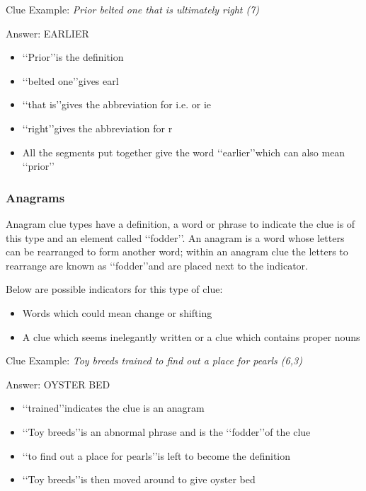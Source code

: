 Clue Example: \emph{Prior belted one that is ultimately right (7)}

Answer: EARLIER 

\begin{itemize}
	\item \lq\lq Prior\rq\rq is the definition 
	\item \lq\lq belted one\rq\rq gives earl 
	\item \lq\lq that is\rq\rq gives the abbreviation for i.e. or ie 
	\item \lq\lq right\rq\rq gives the abbreviation for r 
	\item All the segments put together give the word \lq\lq earlier\rq\rq which can also mean \lq\lq prior\rq\rq
\end{itemize}

\subsubsection{Anagrams}

Anagram clue types have a definition, a word or phrase to indicate the clue is of this type and an element called \lq\lq fodder\rq\rq. An anagram is a word whose letters can be rearranged to form another word; within an anagram clue the letters to rearrange are known as \lq\lq fodder\rq\rq and are placed next to the indicator.  

Below are possible indicators for this type of clue:
\begin{itemize} 
	\item Words which could mean change or shifting 
	\item A clue which seems inelegantly written or a clue which contains proper nouns
\\
\end{itemize}

Clue Example: \emph{Toy breeds trained to find out a place for pearls (6,3)}

Answer: OYSTER BED 

\begin{itemize}
	\item \lq\lq trained\rq\rq indicates the clue is an anagram   
	\item \lq\lq Toy breeds\rq\rq is an abnormal phrase and is the \lq\lq fodder\rq\rq of the clue 
	\item \lq\lq to find out a place for pearls\rq\rq is left to become the definition 
	\item \lq\lq Toy breeds\rq\rq is then moved around to give oyster bed 
\end{itemize}

